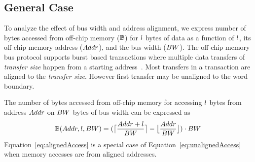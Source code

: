 \subsection{General Case}
To analyze the effect of bus width and address alignment, we express number of bytes accessed from off-chip memory ($\numBytesOffChip$) for $\dataLength$ bytes of data as a function of $\dataLength$, its off-chip memory address ($\addressSym$), and the bus width ($\busWidth$).
The off-chip memory bus protocol supports burst based transactions where multiple data transfers of \emph{transfer size} happen from a starting address~\cite{AxiProtocolSpec}. Most transfers in a transaction are aligned to the \emph{transfer size}. However first transfer may be unaligned to the word boundary. 

The number of bytes accessed from off-chip memory for accessing $\dataLength$ bytes from address $\addressSym$ on $\busWidth$ bytes of bus width can be expressed as
\begin{equation}\label{eq:unalignedAccess}
	\begin{aligned}
		\numBytesOffChip(\addressSym,\dataLength,\busWidth)=(\ceil[\big]{\frac{\addressSym+\dataLength}{\busWidth}}-\floor[\big]{\frac{\addressSym}{\busWidth}})\cdot{\busWidth}
	\end{aligned}
\end{equation}
Equation~\ref{eq:alignedAccess} is a special case of Equation~\ref{eq:unalignedAccess} when memory accesses are from aligned addresses.
